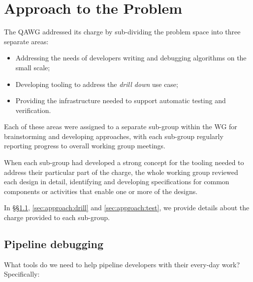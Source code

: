 \section{Approach to the Problem}
\label{sec:approach}

The QAWG addressed its charge by sub-dividing the problem space into three separate areas:

\begin{itemize}

  \item{Addressing the needs of developers writing and debugging algorithms on the small scale;}
  \item{Developing tooling to address the \textit{\gls{drill down}} use case;}
  \item{Providing the infrastructure needed to support automatic testing and verification.}

\end{itemize}

Each of these areas were assigned to a separate sub-group within the WG for
brainstorming and developing approaches, with each sub-group regularly
reporting progress to overall working group meetings.

When each sub-group had developed a strong concept for the tooling needed to
address their particular part of the charge, the whole working group reviewed
each design in detail, identifying and developing specifications for common
components or activities that enable one or more of the designs.

In \S\S\ref{sec:approach:debug}, \ref{sec:approach:drill} and
\ref{sec:approach:test}, we provide details about the charge provided to each
sub-group.

\subsection{Pipeline debugging}
\label{sec:approach:debug}

What tools do we need to help pipeline developers with their every-day work?
Specifically:

